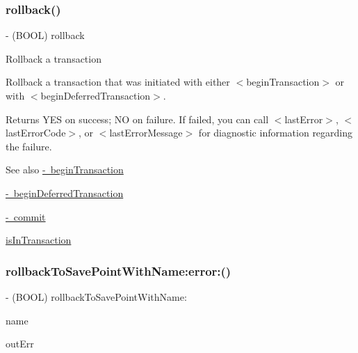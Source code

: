\subsubsection{\texorpdfstring{rollback()}{rollback()}}
{\footnotesize\ttfamily -\/ (B\+O\+OL) rollback \begin{DoxyParamCaption}{ }\end{DoxyParamCaption}}

Rollback a transaction

Rollback a transaction that was initiated with either {\ttfamily $<$begin\+Transaction$>$} or with {\ttfamily $<$begin\+Deferred\+Transaction$>$}.

\begin{DoxyReturn}{Returns}
{\ttfamily Y\+ES} on success; {\ttfamily NO} on failure. If failed, you can call {\ttfamily $<$last\+Error$>$}, {\ttfamily $<$last\+Error\+Code$>$}, or {\ttfamily $<$last\+Error\+Message$>$} for diagnostic information regarding the failure.
\end{DoxyReturn}
\begin{DoxySeeAlso}{See also}
\mbox{\hyperlink{interface_o_p_t_l_y_f_m_d_b_database_aa49b282394be0570adb7ae4b8544b6b5}{-\/ begin\+Transaction}} 

\mbox{\hyperlink{interface_o_p_t_l_y_f_m_d_b_database_ae42926b392d7862b8e4a2c7da6e12552}{-\/ begin\+Deferred\+Transaction}} 

\mbox{\hyperlink{interface_o_p_t_l_y_f_m_d_b_database_a13149a1989b1cdb7a6f7b8f2b4207cfd}{-\/ commit}} 

\mbox{\hyperlink{interface_o_p_t_l_y_f_m_d_b_database_aad9ac9a8b17ad02d9595a11567ceb404}{is\+In\+Transaction}} 
\end{DoxySeeAlso}
\mbox{\label{interface_o_p_t_l_y_f_m_d_b_database_a8ae3bd5f48fed1f09b14328fc777dab5}} 
\subsubsection{\texorpdfstring{rollback\+To\+Save\+Point\+With\+Name\+:error\+:()}{rollbackToSavePointWithName:error:()}}
{\footnotesize\ttfamily -\/ (B\+O\+OL) rollback\+To\+Save\+Point\+With\+Name\+: \begin{DoxyParamCaption}\item[{(N\+S\+String $\ast$)}]{name }\item[{error:(N\+S\+Error $\ast$\+\_\+\+Nullable $\ast$)}]{out\+Err }\end{DoxyParamCaption}}

